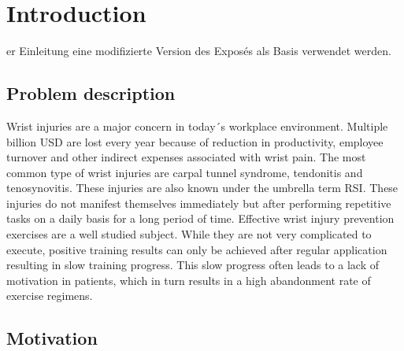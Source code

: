 \chapter{Introduction}
\label{sec:introduction}

er Einleitung eine modifizierte Version des Exposés als Basis verwendet werden.

\section{Problem description}

Wrist injuries are a major concern in today´s workplace environment.
Multiple billion USD are lost every year because of reduction in productivity, employee turnover and other indirect expenses associated with wrist pain\cite{freitas2017serious}. 
The most common type of wrist injuries are carpal tunnel syndrome, tendonitis and tenosynovitis. 
These injuries are also known under the umbrella term \gls{RSI}. 
These injuries do not manifest themselves immediately but after performing repetitive tasks on a daily basis for a long period of time. 
Effective wrist injury prevention exercises are a well studied subject. 
While they are not very complicated to execute, positive training results can only be achieved after regular application resulting in slow training progress. 
This slow progress often leads to a lack of motivation in patients, which in turn results in a high abandonment rate of exercise regimens\cite{campbell2001don}.

\section{Motivation}

